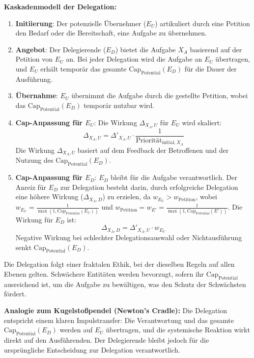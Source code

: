 \documentclass[12pt]{scrartcl}
\begin{document}
\textbf{Kaskadenmodell der Delegation:}
\begin{enumerate}
    \item \textbf{Initiierung}: Der potenzielle Übernehmer ($E_U$) artikuliert durch eine Petition den Bedarf oder die Bereitschaft, eine Aufgabe zu übernehmen.
    \item \textbf{Angebot}: Der Delegierende ($E_D$) bietet die Aufgabe $X_A$ basierend auf der Petition von $E_U$ an. Bei jeder Delegation wird die Aufgabe an $E_U$ übertragen, und $E_U$ erhält temporär das gesamte $\text{Cap}_{\text{Potential}}(E_D)$ für die Dauer der Ausführung.
    \item \textbf{Übernahme}: $E_U$ übernimmt die Aufgabe durch die gestellte Petition, wobei das $\text{Cap}_{\text{Potential}}(E_D)$ temporär nutzbar wird.
    \item \textbf{Cap-Anpassung für $E_U$}: Die Wirkung $\Delta_{X_A,U}$ für $E_U$ wird skaliert:
    \begin{equation}
    \Delta_{X_A,U} = \Delta'_{X_A,U} \cdot \frac{1}{\text{Priorität}_{\text{initial}, X_A}}
    \label{eq:SkalierteWirkung}
    \end{equation}
    Die Wirkung $\Delta_{X_A,U}$ basiert auf dem Feedback der Betroffenen und der Nutzung des $\text{Cap}_{\text{Potential}}(E_D)$.
    \item \textbf{Cap-Anpassung für $E_D$}: $E_D$ bleibt für die Aufgabe verantwortlich. Der Anreiz für $E_D$ zur Delegation besteht darin, durch erfolgreiche Delegation eine höhere Wirkung ($\Delta_{X_A,D}$) zu erzielen, da $w_{E_U} > w_{\text{Petition}}$, wobei $w_{E_U} = \frac{1}{\max(1, \text{Cap}_{\text{Potential}}(E_U))}$ und $w_{\text{Petition}} = w_{E'} = \frac{1}{\max(1, \text{Cap}_{\text{Potential}}(E'))}$. Die Wirkung für $E_D$ ist:
    \begin{equation}
    \Delta_{X_A,D} = \Delta'_{X_A,U} \cdot w_{E_U}
    \label{eq:WirkungED}
    \end{equation}
    Negative Wirkung bei schlechter Delegationsauswahl oder Nichtausführung senkt $\text{Cap}_{\text{Potential}}(E_D)$.
\end{enumerate}
Die Delegation folgt einer fraktalen Ethik, bei der dieselben Regeln auf allen Ebenen gelten. Schwächere Entitäten werden bevorzugt, sofern ihr $\text{Cap}_{\text{Potential}}$ ausreichend ist, um die Aufgabe zu bewältigen, was den Schutz der Schwächsten fördert.

\textbf{Analogie zum Kugelstoßpendel (Newton’s Cradle):}
Die Delegation entspricht einem klaren Impulstransfer: Die Verantwortung und das gesamte $\text{Cap}_{\text{Potential}}(E_D)$ werden auf $E_U$ übertragen, und die systemische Reaktion wirkt direkt auf den Ausführenden. Der Delegierende bleibt jedoch für die ursprüngliche Entscheidung zur Delegation verantwortlich.
\end{document}
